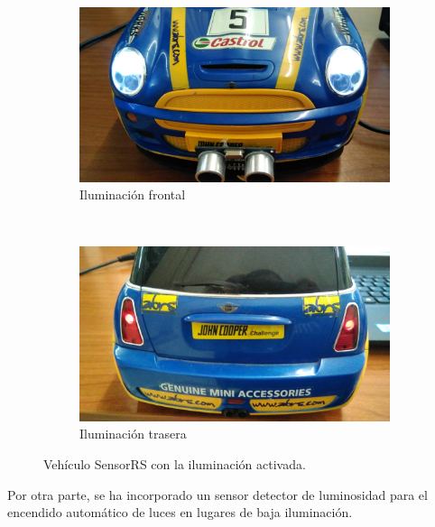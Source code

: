 \begin{figure}[H]
    \centering
    \begin{subfigure}[b]{0.4\textwidth}
        \includegraphics[width=\textwidth]{imagenes/robot/luces_delanteras.jpg}
        \caption{Iluminación frontal}
        \label{fig:gull}
    \end{subfigure}
    ~ %
    \begin{subfigure}[b]{0.4\textwidth}
        \includegraphics[width=\textwidth]{imagenes/robot/luces_traseras.jpg}
        \caption{Iluminación trasera}
        \label{fig:tiger}
    \end{subfigure}
    \caption{Vehículo SensorRS con la iluminación activada.}\label{fig:iluminacion}
\end{figure}


Por otra parte, se ha incorporado un sensor detector de luminosidad para el encendido automático de luces en lugares de baja iluminación.\\


